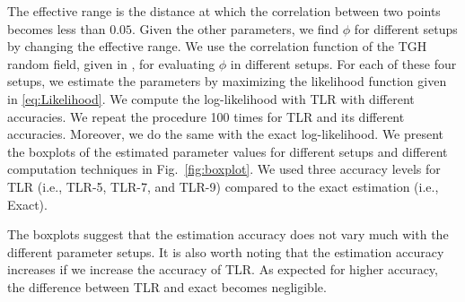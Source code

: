 \documentclass[conference]{IEEEtran}
\begin{document}
The effective range is the distance at which the correlation between two points becomes less than $0.05$. Given the other parameters, we find $\phi$ for different setups by changing the effective range. We use the correlation function of the TGH random field, given in \cite{xu2017tukey}, for evaluating $\phi$ in different setups. 
For each of these four setups, we estimate the parameters by maximizing the likelihood function given in \eqref{eq:Likelihood}. We compute the log-likelihood with TLR with different accuracies. We repeat the procedure 100 times for TLR and its different accuracies. Moreover, we do the same with the exact log-likelihood. We present the boxplots of the estimated parameter values for different setups and different computation techniques in Fig.~\ref{fig:boxplot}. We used three accuracy levels for TLR (i.e., TLR-5, TLR-7, and TLR-9) compared to the exact estimation (i.e., Exact).


The boxplots suggest that the estimation accuracy does not vary much with the different parameter setups. It is also worth noting that the estimation accuracy increases if we increase the accuracy of TLR. As expected for higher accuracy, the difference between TLR and exact becomes negligible.



%
\end{document}
